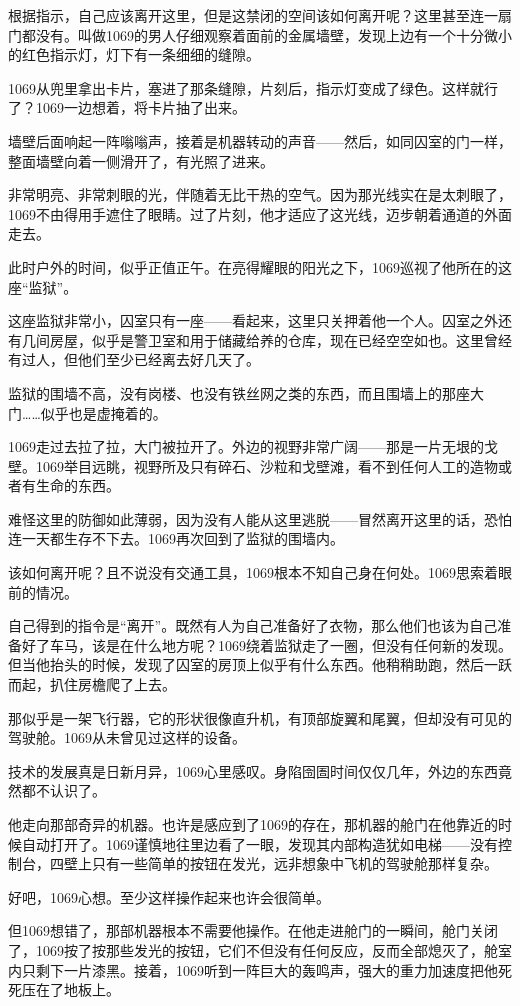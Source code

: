 根据指示，自己应该离开这里，但是这禁闭的空间该如何离开呢？这里甚至连一扇门都没有。叫做1069的男人仔细观察着面前的金属墙壁，发现上边有一个十分微小的红色指示灯，灯下有一条细细的缝隙。

1069从兜里拿出卡片，塞进了那条缝隙，片刻后，指示灯变成了绿色。这样就行了？1069一边想着，将卡片抽了出来。

墙壁后面响起一阵嗡嗡声，接着是机器转动的声音——然后，如同囚室的门一样，整面墙壁向着一侧滑开了，有光照了进来。

非常明亮、非常刺眼的光，伴随着无比干热的空气。因为那光线实在是太刺眼了，1069不由得用手遮住了眼睛。过了片刻，他才适应了这光线，迈步朝着通道的外面走去。

此时户外的时间，似乎正值正午。在亮得耀眼的阳光之下，1069巡视了他所在的这座“监狱”。

这座监狱非常小，囚室只有一座——看起来，这里只关押着他一个人。囚室之外还有几间房屋，似乎是警卫室和用于储藏给养的仓库，现在已经空空如也。这里曾经有过人，但他们至少已经离去好几天了。

监狱的围墙不高，没有岗楼、也没有铁丝网之类的东西，而且围墙上的那座大门……似乎也是虚掩着的。

1069走过去拉了拉，大门被拉开了。外边的视野非常广阔——那是一片无垠的戈壁。1069举目远眺，视野所及只有碎石、沙粒和戈壁滩，看不到任何人工的造物或者有生命的东西。

难怪这里的防御如此薄弱，因为没有人能从这里逃脱——冒然离开这里的话，恐怕连一天都生存不下去。1069再次回到了监狱的围墙内。

该如何离开呢？且不说没有交通工具，1069根本不知自己身在何处。1069思索着眼前的情况。

自己得到的指令是“离开”。既然有人为自己准备好了衣物，那么他们也该为自己准备好了车马，该是在什么地方呢？1069绕着监狱走了一圈，但没有任何新的发现。但当他抬头的时候，发现了囚室的房顶上似乎有什么东西。他稍稍助跑，然后一跃而起，扒住房檐爬了上去。

那似乎是一架飞行器，它的形状很像直升机，有顶部旋翼和尾翼，但却没有可见的驾驶舱。1069从未曾见过这样的设备。

技术的发展真是日新月异，1069心里感叹。身陷囹圄时间仅仅几年，外边的东西竟然都不认识了。

他走向那部奇异的机器。也许是感应到了1069的存在，那机器的舱门在他靠近的时候自动打开了。1069谨慎地往里边看了一眼，发现其内部构造犹如电梯——没有控制台，四壁上只有一些简单的按钮在发光，远非想象中飞机的驾驶舱那样复杂。

好吧，1069心想。至少这样操作起来也许会很简单。

但1069想错了，那部机器根本不需要他操作。在他走进舱门的一瞬间，舱门关闭了，1069按了按那些发光的按钮，它们不但没有任何反应，反而全部熄灭了，舱室内只剩下一片漆黑。接着，1069听到一阵巨大的轰鸣声，强大的重力加速度把他死死压在了地板上。

